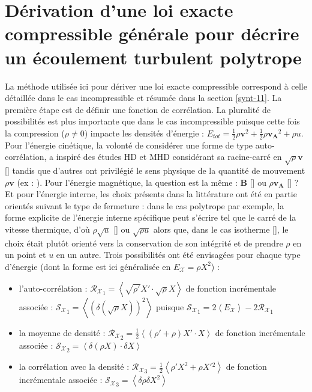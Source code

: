 \section{Dérivation d'une loi exacte compressible générale pour décrire un écoulement turbulent polytrope}
\label{sec-131}

La méthode utilisée ici pour dériver une loi exacte compressible correspond à celle détaillée dans le cas incompressible et résumée dans la section \ref{synt-11}. La première étape est de définir une fonction de corrélation. La pluralité de possibilités est plus importante que dans le cas incompressible puisque cette fois la compression ($\rho \neq 0$) impacte les densités d'énergie : $E_{tot} = \frac{1}{2} \rho \boldsymbol{v}^2 + \frac{1}{2} \rho \boldsymbol{v_A}^2 + \rho u $. Pour l'énergie cinétique, la volonté de considérer une forme de type auto-corrélation, a inspiré des études \ac{HD} et \ac{MHD} considérant sa racine-carré en $\sqrt{\rho} \boldsymbol{v} $ [\cite{hellinger_spectral_2021}] tandis que d'autres ont privilégié le sens physique de la quantité de mouvement $\rho \boldsymbol{v}$ (ex : \cite{galtier_exact_2011}). Pour l'énergie magnétique, la question est la même : $\boldsymbol{B}$ [\cite{ferrand_compact_2021}] ou $\rho \boldsymbol{v_A}$ [\cite{andres_alternative_2017}] ? Et pour l'énergie interne, les choix présents dans la littérature ont été en partie orientés suivant le type de fermeture : dans le cas polytrope par exemple, la forme explicite de l'énergie interne spécifique peut s'écrire tel que le carré de la vitesse thermique, d'où $\rho \sqrt{u}$ [\cite{banerjee_kolmogorov-like_2014}] ou $\sqrt{\rho u}$ alors que, dans le cas isotherme [\cite{galtier_exact_2011}], le choix était plutôt orienté vers la conservation de son intégrité et de prendre $\rho$ en un point et $u$ en un autre. Trois possibilités ont été envisagées pour chaque type d'énergie (dont la forme est ici généralisée en $E_\mathcal{X} = \rho X^2$) : 
\begin{itemize}
    \item l'auto-corrélation : $\mathcal{R_{X}}_1 = \left<\sqrt{\rho'} X' \cdot \sqrt{\rho} X \right>$ de fonction incrémentale associée :  $\mathcal{S_{X}}_1 = \left<\left(\delta \left(\sqrt{\rho} X\right)\right)^2\right>$ puisque $\mathcal{S_{X}}_1 = 2\left<E_\mathcal{X}\right> - 2\mathcal{R_{X}}_1 $
    \item la moyenne de densité : $\mathcal{R_{X}}_2 = \frac{1}{2}\left< \left(\rho'+\rho\right) X' \cdot X \right>$ de fonction incrémentale associée :  $\mathcal{S_{X}}_2 = \left<\delta \left(\rho X\right) \cdot \delta X \right>$ 
    \item la corrélation avec la densité : $\mathcal{R_{X}}_3 = \frac{1}{2}\left< \rho' X^2 + \rho X'{}^2\right> $ de fonction incrémentale associée :  $\mathcal{S_{X}}_3 = \left<\delta \rho  \delta X^2 \right>$ 
\end{itemize}
